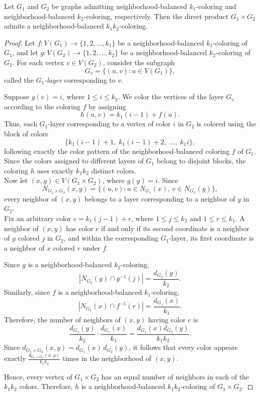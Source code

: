 \documentclass[10pt,a4paper]{amsart}
\def\ni{\noindent}
\begin{document}
\begin{theorem} Let $G_1$ and $G_2$ be graphs admitting neighborhood-balanced $k_1$-coloring and neighborhood-balanced $k_2$-coloring, respectively. Then the direct product $G_1\times G_2$ admits a neighborhood-balanced $k_1k_2$-coloring.
\end{theorem}

\begin{proof}
Let
$f:V(G_1)\rightarrow \{1,2,\ldots,k_1\}$
be a neighborhood-balanced $k_1$-coloring of $G_1$, and let
$g:V(G_2)\rightarrow \{1,2,\ldots,k_2\}$
be a neighborhood-balanced $k_2$-coloring of $G_2$.
For each vertex $v\in V(G_2)$, consider the subgraph
\[
G_v=\{(u,v):u\in V(G_1)\},
\]
called the \emph{$G_1$-layer} corresponding to $v$.

\ni Suppose $g(v)=i$, where $1\le i\le k_2$. We color the vertices of the layer $G_v$ according to the coloring $f$ by assigning
\[
h(u,v)=k_1(i-1)+f(u).
\]
Thus, each $G_1$-layer corresponding to a vertex of color $i$ in $G_2$ is colored using the block of colors
\[
\{k_1(i-1)+1,\;k_1(i-1)+2,\;\ldots,\;k_1i\},
\]
following exactly the color pattern of the neighborhood-balanced coloring $f$ of $G_1$.
 Since the colors assigned to different layers of $G_1$ belong to disjoint blocks, the coloring $h$ uses exactly $k_1k_2$ distinct colors.\\
Now let $(x,y)\in V(G_1\times G_2)$, where $g(y)=i$. Since
\[
N_{G_1\times G_2}(x,y)
=
\{(u,v):u\in N_{G_1}(x),\,v\in N_{G_2}(y)\},
\]
every neighbor of $(x,y)$ belongs to a layer corresponding to a neighbor of $y$ in $G_2$.\\
\ni 
Fix an arbitrary color
$
c=k_1(j-1)+r$,
where $1\le j\le k_2$ and $1\le r\le k_1$.
A neighbor of $(x,y)$ has color $c$ if and only if its second coordinate is a neighbor of $y$ colored $j$ in $G_2$, and within the corresponding $G_1$-layer, its first coordinate is a neighbor of $x$ colored $r$ under $f$.

\ni
Since $g$ is a neighborhood-balanced $k_2$-coloring,
\[
\left|N_{G_2}(y)\cap g^{-1}(j)\right|
=
\frac{d_{G_2}(y)}{k_2}.
\]
Similarly, since $f$ is a neighborhood-balanced $k_1$-coloring,
\[
\left|N_{G_1}(x)\cap f^{-1}(r)\right|
=
\frac{d_{G_1}(x)}{k_1}.
\]
\ni
Therefore, the number of neighbors of $(x,y)$ having color $c$ is
\[
\frac{d_{G_2}(y)}{k_2}
\cdot
\frac{d_{G_1}(x)}{k_1}
=
\frac{d_{G_1}(x)d_{G_2}(y)}{k_1k_2}.
\]
\ni
Since
$d_{G_1\times G_2}(x,y)
=
d_{G_1}(x)\,d_{G_2}(y)$,
it follows that every color appears exactly
$\frac{d_{G_1\times G_2}(x,y)}{k_1k_2}$
times in the neighborhood of $(x,y)$.

\ni Hence, every vertex of $G_1\times G_2$ has an equal number of neighbors in each of the $k_1k_2$ colors. Therefore, $h$ is a neighborhood-balanced $k_1k_2$-coloring of $G_1\times G_2$.
\end{proof}
\end{document}
